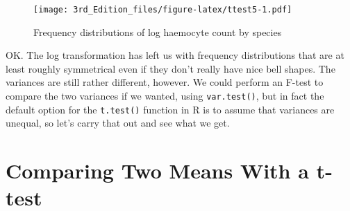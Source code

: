 \documentclass[
]{book}
\newenvironment{Shaded}{\begin{snugshade}}{\end{snugshade}}
\newcommand{\DataTypeTok}[1]{\textcolor[rgb]{0.13,0.29,0.53}{#1}}
\newcommand{\DecValTok}[1]{\textcolor[rgb]{0.00,0.00,0.81}{#1}}
\newcommand{\FloatTok}[1]{\textcolor[rgb]{0.00,0.00,0.81}{#1}}
\newcommand{\KeywordTok}[1]{\textcolor[rgb]{0.13,0.29,0.53}{\textbf{#1}}}
\newcommand{\NormalTok}[1]{#1}
\newcommand{\OperatorTok}[1]{\textcolor[rgb]{0.81,0.36,0.00}{\textbf{#1}}}
\newcommand{\StringTok}[1]{\textcolor[rgb]{0.31,0.60,0.02}{#1}}
\begin{document}
\begin{Shaded}
\end{Shaded}

\begin{figure}
\centering
\texttt{[image: 3rd\_Edition\_files/figure-latex/ttest5-1.pdf]}
\caption{\label{fig:ttest5}Frequency distributions of log haemocyte count by species}
\end{figure}

OK. The log transformation has left us with frequency distributions that are at least roughly symmetrical even if they don't really have nice bell shapes. The variances are still rather different, however. We could perform an F-test to compare the two variances if we wanted, using \texttt{var.test()}, but in fact the default option for the \texttt{t.test()} function in R is to assume that variances are unequal, so let's carry that out and see what we get.

\hypertarget{comparing-two-means-with-a-t-test}{%
\section{Comparing Two Means With a t-test}\label{comparing-two-means-with-a-t-test}}
\end{document}
